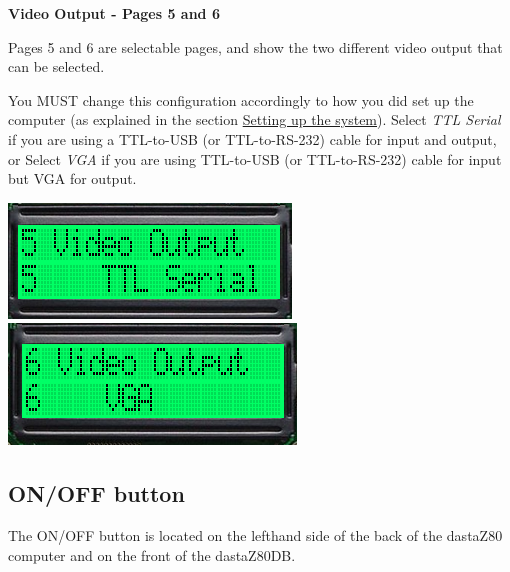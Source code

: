 
        \textbf{Video Output - Pages 5 and 6}

        Pages 5 and 6 are selectable pages, and show the two different video
        output that can be selected.

        You MUST change this configuration accordingly to how you did set up the
        computer (as explained in the section \hyperref[sec:setting_system]
        {Setting up the system}). Select \textit{TTL Serial} if you are using
        a TTL-to-USB (or TTL-to-RS-232) cable for input and output, or Select 
        \textit{VGA} if you are using TTL-to-USB (or TTL-to-RS-232) cable for
        input but VGA for output.

        \begin{center}
            \includegraphics[scale=0.7]{images/dastaZ80_ControlPanel_Page5.png}
            \includegraphics[scale=0.7]{images/dastaZ80_ControlPanel_Page6.png}
        \end{center}

    \pagebreak
    
    \subsection{ON/OFF button}
    \label{subsec:onoffbutt}

    The ON/OFF button is located on the lefthand side of the back of the
    dastaZ80 computer and on the front of the dastaZ80DB.

